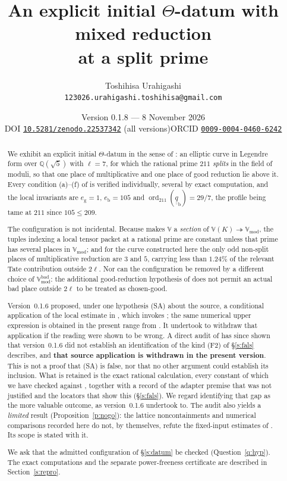 \documentclass[11pt]{article}
\title{An explicit initial $\Theta$-datum with mixed reduction\\
at a split prime}
\author{Toshihisa Urahigashi\\
\small\texttt{123026.urahigashi.toshihisa@gmail.com}}
\date{Version 0.1.8 --- 8 November 2026\\[3pt]
\small DOI \href{https://doi.org/10.5281/zenodo.22537342}{\texttt{10.5281/zenodo.22537342}} (all versions)\qquad ORCID \href{https://orcid.org/0009-0004-0460-6242}{\texttt{0009-0004-0460-6242}}}
\theoremstyle{plain}
\theoremstyle{definition}
\newcommand{\Vmod}{\mathbb{V}_{\mathrm{mod}}}
\newcommand{\Vbad}{\mathbb{V}^{\mathrm{bad}}}
\newcommand{\VV}{\mathbb{V}}
\newcommand{\SA}{\textup{(SA)}}
\newcommand{\ord}{\operatorname{ord}}
\begin{document}
\maketitle

\begin{abstract}
We exhibit an explicit initial $\Theta$-datum in the sense of
\cite[Def.~3.1]{IUT1}: an elliptic curve in Legendre form over
$\mathbb{Q}(\sqrt5)$ with $\ell=7$, for which the rational prime $211$
\emph{splits} in the field of moduli, so that one place of multiplicative and one
place of good reduction lie above it.  Every condition (a)--(f) of
\cite[Def.~3.1]{IUT1} is verified individually, several by exact computation, and
the local invariants are $e_{\mathrm{g}}=1$, $e_{\mathrm{b}}=105$ and
$\ord_{211}(\underline{\underline q}_{\mathrm{b}})=29/7$, the profile being tame
at $211$ since $105\le209$.

The configuration is not incidental.  Because \cite[Def.~3.1(e)]{IUT1} makes
$\VV$ a \emph{section} of $\VV(K)\twoheadrightarrow\Vmod$, the tuples indexing a
local tensor packet at a rational prime are constant unless that prime has
several places in $\Vmod$; and for the curve constructed here the only odd
non-split places of multiplicative reduction are $3$ and $5$, carrying less than
$1.24\%$ of the relevant Tate contribution outside $2\ell$.  Nor can the
configuration be removed by a different choice of $\Vbad_{\mathrm{mod}}$: the
additional good-reduction hypothesis of \cite[Thm.~1.10]{IUT4} does not permit an
actual bad place outside $2\ell$ to be treated as chosen-good.

Version~0.1.6 proposed, under one hypothesis \SA{} about the source, a
conditional application of the local estimate in
\cite[Thm.~1.10, proof, Step~(v)]{IUT4}, which invokes
\cite[Prop.~1.4(iii)]{IUT4}; the same numerical upper expression is obtained in
the present range from \cite[Prop.~1.2(iii)]{IUT4}.  It undertook to withdraw that
application if the reading were shown to be wrong.  A direct audit of
\cite{IUT4} has since shown that version~0.1.6 did not establish an
identification of the kind \textup{(F2)} of \S\ref{s:fals} describes, and \textbf{that
source application is withdrawn in the present version}.  This is not a proof
that \SA{} is false, nor that no other argument could establish its inclusion.  What is retained is the exact rational calculation, every constant of
which we have checked against \cite[Prop.~1.1, Prop.~1.2, Prop.~1.4]{IUT4},
together with a record of the adapter premise that was not justified and the
locators that show this (\S\ref{s:fals}).  We regard identifying that gap as the
more valuable outcome, as version~0.1.6 undertook to.  The audit also yields a \emph{limited}
result (Proposition~\ref{p:nogo}): the lattice noncontainments and numerical
comparisons recorded here do not, by themselves, refute the fixed-input estimates
of \cite{IUT4}.  Its scope is stated with it.

We ask that the admitted configuration of \S\ref{s:datum} be checked
(Question~\ref{q:hyp}).
The exact computations and the separate power-freeness certificate are
described in Section~\ref{s:repro}.
\end{abstract}
\end{document}
